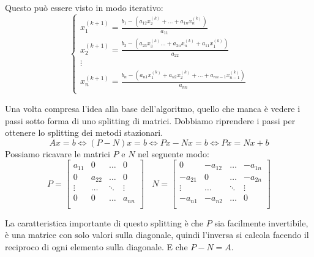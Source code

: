 Questo può essere visto in modo iterativo:
\begin{equation*}
    \begin{cases}
        x_1^{(k+1)} = \frac{b_1 - (a_{12} x_2^{(k)} + \dots + a_{1n} x_n^{(k)})}{ a_{11}}                       \\
        x_2^{(k+1)} =\frac{ b_2 - (a_{23} x_3^{(k)}\dots + a_{2n} x_n^{(k)} + a_{11}x_1^{(k)})}{a_{22}}         \\
        \vdots                                                                                                  \\
        x_n^{(k+1)}= \frac{b_n - (a_{n1}x_1^{(k)} + a_{n2} x_2^{(k)} + \dots + a_{nn-1} x_{n-1}^{(k)})}{a_{nn}} \\
    \end{cases}
\end{equation*}

Una volta compresa l'idea alla base dell'algoritmo, quello che manca è vedere
i passi sotto forma di uno splitting di matrici. Dobbiamo riprendere i passi per
ottenere lo splitting dei metodi stazionari.
\begin{equation*}
    Ax = b \iff (P - N)x = b \iff Px - Nx = b \iff Px = Nx + b
\end{equation*}
Possiamo ricavare le matrici $P$ e $N$ nel seguente modo:
\begin{equation*}
    P= \left[\begin{array}{cccc}
            a_{11} & 0      & \dots  & 0      \\
            0      & a_{22} & \dots  & 0      \\
            \vdots & \dots  & \ddots & \vdots \\
            0      & 0      & \dots  & a_{nn} \\
        \end{array}\right]
    \ \ \ \
    N = \left[\begin{array}{cccc}
            0       & -a_{12} & \dots  & -a_{1n} \\
            -a_{21} & 0       & \dots  & -a_{2n} \\
            \vdots  & \dots   & \ddots & \vdots  \\
            -a_{n1} & -a_{n2} & \dots  & 0       \\
        \end{array}\right]
\end{equation*}

La caratteristica importante di questo splitting è che $P$ sia facilmente
invertibile, è una matrice con solo valori sulla diagonale, quindi l'inversa si
calcola facendo il reciproco di ogni elemento sulla diagonale. E che $P - N =A$.

